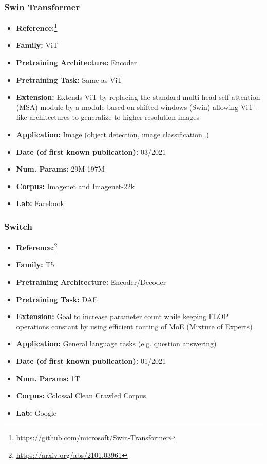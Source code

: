 \documentclass{article}
\begin{document}
\subsubsection{ Swin Transformer}

            \begin{itemize}
                \item \textbf{Reference:}\footnote{\url{https://github.com/microsoft/Swin-Transformer}}\cite{liu2021swin}
                \item \textbf{Family:} ViT 
                \item \textbf{Pretraining Architecture:} Encoder
                \item \textbf{Pretraining Task:} Same as ViT
                \item \textbf{Extension:} Extends ViT by replacing the standard multi-head self attention (MSA) module by a module based on shifted windows (Swin) allowing ViT-like architectures to generalize to higher resolution images  
                \item \textbf{Application:} Image (object detection, image classification..)
                \item \textbf{Date (of first known publication):} 03/2021
                \item \textbf{Num. Params:} 29M-197M
                \item \textbf{Corpus:} Imagenet and Imagenet-22k
                \item \textbf{Lab:} Facebook
            \end{itemize}

\subsubsection{Switch}

            \begin{itemize}
                \item \textbf{Reference:}\footnote{\url{https://arxiv.org/abs/2101.03961}}\cite{fedus2021switch}
                \item \textbf{Family:} T5 
                \item \textbf{Pretraining Architecture:} Encoder/Decoder
                \item \textbf{Pretraining Task:} DAE
                \item \textbf{Extension:} Goal to increase parameter count while keeping FLOP operations constant by using efficient routing of MoE (Mixture of Experts)  
                \item \textbf{Application:} General language tasks (e.g. question answering)
                \item \textbf{Date (of first known publication):} 01/2021
                \item \textbf{Num. Params:} 1T
                \item \textbf{Corpus:} Colossal Clean Crawled Corpus
                \item \textbf{Lab:} Google
            \end{itemize}
\end{document}
